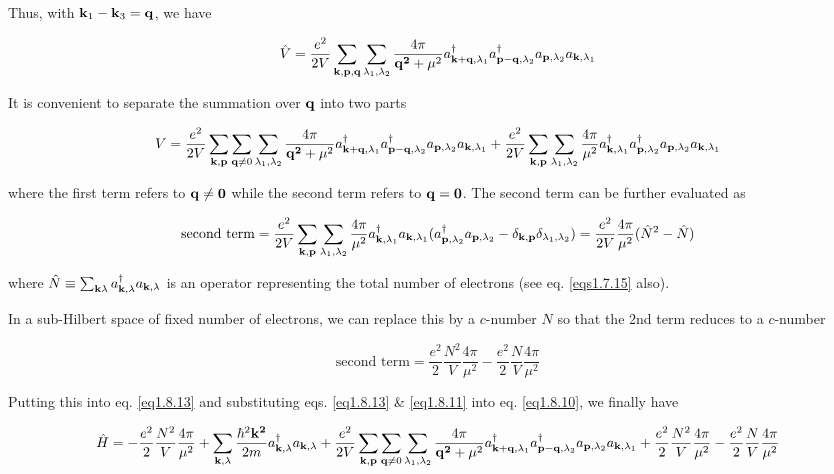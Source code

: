 Thus, with ${\bf k}_1 - {\bf k}_3 = \bf q$, we have

\begin{align}
\hat{V}=\frac{e^2}{2V}\sum_{\bf k,p,q}\sum_{\lambda_1,\lambda_2}\frac{4\pi}{{\bf q^2}+\mu^2}a^\dagger_{{\bf k+q},\lambda_1}a^\dagger_{{\bf p-q},\lambda_2}a_{{\bf p},\lambda_2}a_{{\bf k},\lambda_1}
\end{align}

It is convenient to separate the summation over $\bf q$ into two parts

\begin{align}\label{eq1.8.13}
V=\frac{e^2}{2V}\sum_{\bf k,p}\sum_{{\bf q}\neq0}\sum_{\lambda_1,\lambda_2}\frac{4\pi}{{\bf q^2}+\mu^2}a^\dagger_{{\bf k+q},\lambda_1}a^\dagger_{{\bf p-q},\lambda_2}a_{{\bf p},\lambda_2}a_{{\bf k},\lambda_1} + \frac{e^2}{2V}\sum_{\bf k,p}\sum_{\lambda_1,\lambda_2}\frac{4\pi}{\mu^2}a^\dagger_{{\bf k},\lambda_1}a^\dagger_{{\bf p},\lambda_2}a_{{\bf p},\lambda_2}a_{{\bf k},\lambda_1}
\end{align}

where the first term refers to $\bf q\neq0$ while the second term refers to $\bf q=0$. The second term can be further evaluated as 

\[\text{second term}= \frac{e^2}{2V}\sum_{\bf k,p}\sum_{\lambda_1,\lambda_2}\frac{4\pi}{\mu^2}a^\dagger_{{\bf k},\lambda_1}a_{{\bf k},\lambda_1}(a^\dagger_{{\bf p},\lambda_2}a_{{\bf p},\lambda_2}-\delta_{\bf k,p}\delta_{\lambda_1,\lambda_2}) = \frac{e^2}{2V}\frac{4\pi}{\mu^2}(\hat{N}^2-\hat{N})\]

where $\hat{N}\equiv\sum_{{\bf k}\lambda}a_{{\bf k},\lambda}^\dagger a_{{\bf k},\lambda}$ is an operator representing the total number of electrons (see eq. \eqref{eqs1.7.15} also). 

In a sub-Hilbert space of fixed number of electrons, we can replace this by a $c$-number $N$ so that the $2$nd term reduces to a $c$-number

\[\text{second term}=\frac{e^2}{2}\frac{N^2}{V}\frac{4\pi}{\mu^2}-\frac{e^2}{2}\frac{N}{V}\frac{4\pi}{\mu^2}\]

Putting this into eq. \eqref{eq1.8.13} and substituting eqs. \eqref{eq1.8.13} \& \eqref{eq1.8.11} into eq. \eqref{eq1.8.10}, we finally have

\[\hat{H}=-\frac{e^2}{2}\frac{N^2}{V}\frac{4\pi}{\mu^2}+\sum_{{\bf k},\lambda}\frac{\hbar^2\bf k^2}{2m}a^\dagger_{{\bf k},\lambda}a_{{\bf k},\lambda}+\frac{e^2}{2V}\sum_{\bf k,p} \sum_{{\bf q}\neq0}\sum_{\lambda_1,\lambda_2}\frac{4\pi}{{\bf q^2}+\mu^2}a^\dagger_{{\bf k+q},\lambda_1}a^\dagger_{{\bf p-q},\lambda_2}a_{{\bf p},\lambda_2}a_{{\bf k},\lambda_1} + \frac{e^2}{2}\frac{N^2}{V}\frac{4\pi}{\mu^2}-\frac{e^2}{2}\frac{N}{V}\frac{4\pi}{\mu^2} \]

